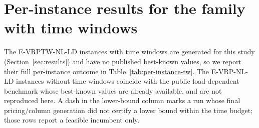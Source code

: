 \documentclass[review,3p,authoryear]{elsarticle}
\theoremstyle{plain}
\theoremstyle{definition}
\theoremstyle{remark}
\begin{document}
\section{Per-instance results for the family with time windows}
\label{app:per-instance-tw}
The E-VRPTW-NL-LD instances with time windows are generated for this study
(Section~\ref{sec:results}) and have no published best-known values, so we report
their full per-instance outcome in Table~\ref{tab:per-instance-tw}. The
E-VRP-NL-LD instances without time windows coincide with the public load-dependent
benchmark whose best-known values are already available, and are not reproduced
here. A dash in the lower-bound column marks a run whose final
pricing/column generation did not certify a lower bound within the time budget;
those rows report a feasible incumbent only.
\end{document}
